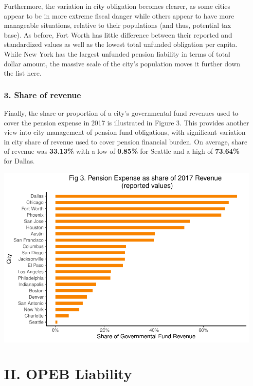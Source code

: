\documentclass[
]{article}
\begin{document}
Furthermore, the variation in city obligation becomes clearer, as some
cities appear to be in more extreme fiscal danger while others appear to
have more manageable situations, relative to their populations (and
thus, potential tax base). As before, Fort Worth has little difference
between their reported and standardized values as well as the lowest
total unfunded obligation per capita. While New York has the largest
unfunded pension liability in terms of total dollar amount, the massive
scale of the city's population moves it further down the list here.

\hypertarget{share-of-revenue}{%
\subsubsection{3. Share of revenue}\label{share-of-revenue}}

Finally, the share or proportion of a city's governmental fund revenues
used to cover the pension expense in 2017 is illustrated in Figure 3.
This provides another view into city management of pension fund
obligations, with significant variation in city share of revenue used to
cover pension financial burden. On average, share of revenue was
\textbf{33.13\%} with a low of \textbf{0.85\%} for Seattle and a high of
\textbf{73.64\%} for Dallas.

\includegraphics{City-Solvency-Report--Adjusted-_files/figure-latex/unnamed-chunk-8-1.pdf}

\hypertarget{ii.-opeb-liability}{%
\section{II. OPEB Liability}\label{ii.-opeb-liability}}
\end{document}
